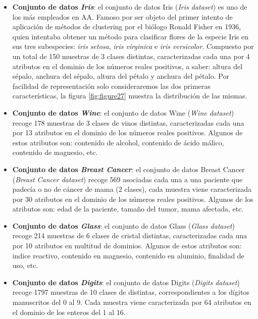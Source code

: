 \begin{itemize}
	
	\item \textbf{Conjunto de datos \textit{Iris}}: el conjunto de datos Iris (\textit{Iris dataset}) es uno de los más empleados en \acs{AA}. Famoso por ser objeto del primer intento de aplicación de métodos de clustering por el biólogo Ronald Fisher en 1936, quien intentaba obtener un método para clasificar flores de la especie Iris en sus tres subespecies: \textit{iris setosa}, \textit{iris virginica} e \textit{iris versicolor}. Compuesto por un total de 150 muestras de 3 clases distintas, caracterizadas cada una por 4 atributos en el dominio de los números reales positivos, a saber: altura del sépalo, anchura del sépalo, altura del pétalo y anchura del pétalo. Por facilidad de representación solo consideraremos las dos primeras características, la figura \ref{fig:figure27} muestra la distribución de las mismas.
	
	\item \textbf{Conjunto de datos \textit{Wine}}: el conjunto de datos Wine (\textit{Wine dataset}) recoge 178 muestras de 3 clases de vinos distintas, caracterizadas cada una por 13 atributos en el dominio de los números reales positivos. Algunos de estos atributos son: contenido de alcohol, contenido de ácido málico, contenido de magnesio, etc.
	
	\item \textbf{Conjunto de datos \textit{Breast Cancer}}: el conjunto de datos Breast Cancer (\textit{Breast Cancer dataset}) recoge 569 asociadas cada una a una paciente que padecía o no de cáncer de mama (2 clases), cada muestra viene caracterizada por 30 atributos en el dominio de los números reales positivos. Algunos de los atributos son: edad de la paciente, tamaño del tumor, mama afectada, etc.
	
	\item \textbf{Conjunto de datos \textit{Glass}}: el conjunto de datos Glass (\textit{Glass dataset}) recoge 214 muestras de 6 clases de cristal distintas, caracterizadas cada una por 10 atributos en multitud de dominios. Algunos de estos atributos son: indice reactivo, contenido en magnesio, contenido en aluminio, finalidad de uso, etc.
	
	\item \textbf{Conjunto de datos \textit{Digits}}: el conjunto de datos Digits (\textit{Digits dataset}) recoge 1797 muestras de 10 clases de distintas, correspondientes a los dígitos manuscritos del 0 al 9. Cada muestra viene caracterizada por 64 atributos en el dominio de los enteros del 1 al 16.
	
\end{itemize}

